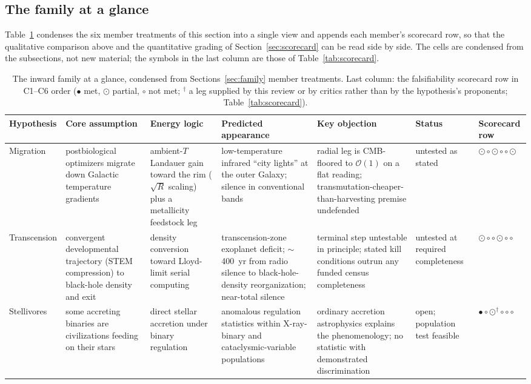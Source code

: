 \documentclass[11pt]{article}
\newcommand{\sfull}{\ensuremath{\bullet}}   %
\newcommand{\shalf}{\ensuremath{\odot}} %
\newcommand{\snone}{\ensuremath{\circ}}     %
\begin{document}
\subsection{The family at a glance}
\label{sec:glance}

Table~\ref{tab:glance} condenses the six member treatments of this section into a single view and appends each member's scorecard row, so that the qualitative comparison above and the quantitative grading of Section~\ref{sec:scorecard} can be read side by side. The cells are condensed from the subsections, not new material; the symbols in the last column are those of Table~\ref{tab:scorecard}.

\begin{table}[tbp]
\centering
\caption{The inward family at a glance, condensed from Sections~\ref{sec:family} member treatments. Last column: the falsifiability scorecard row in C1--C6 order (\sfull{} met, \shalf{} partial, \snone{} not met; $^\dagger$ a leg supplied by this review or by critics rather than by the hypothesis's proponents; Table~\ref{tab:scorecard}).}
\label{tab:glance}
\scriptsize
\setlength{\tabcolsep}{4pt}
\begin{tabular}{p{1.70cm}p{2.05cm}p{2.05cm}p{2.30cm}p{2.45cm}p{1.50cm}p{1.70cm}}
\toprule
Hypothesis & Core assumption & Energy logic & Predicted appearance & Key objection & Status & Scorecard row \\
\midrule
Migration \citep{CirkovicBradbury2006} & postbiological optimizers migrate down Galactic temperature gradients & ambient-$T$ Landauer gain toward the rim ($\sqrt{R}$ scaling) plus a metallicity feedstock leg & low-temperature infrared ``city lights'' at the outer Galaxy; silence in conventional bands & radial leg is CMB-floored to $\mathcal{O}(1)$ on a flat reading; transmutation-cheaper-than-harvesting premise undefended & untested as stated & \shalf\,\snone\,\shalf\,\snone\,\snone\,\shalf \\
Transcension \citep{Smart2012,Smart2019} & convergent developmental trajectory (STEM compression) to black-hole density and exit & density conversion toward Lloyd-limit serial computing & transcension-zone exoplanet deficit; $\sim$400~yr from radio silence to black-hole-density reorganization; near-total silence & terminal step untestable in principle; stated kill conditions outrun any funded census completeness & untested at required completeness & \shalf\,\snone\,\snone\,\shalf\,\snone\,\snone \\
Stellivores \citep{Vidal2014,Vidal2016} & some accreting binaries are civilizations feeding on their stars & direct stellar accretion under binary regulation & anomalous regulation statistics within X-ray-binary and cataclysmic-variable populations & ordinary accretion astrophysics explains the phenomenology; no statistic with demonstrated discrimination & open; population test feasible & \sfull\,\snone\,\shalf$^\dagger$\,\snone\,\snone\,\snone \\

\end{tabular}
\end{table}
\end{document}

